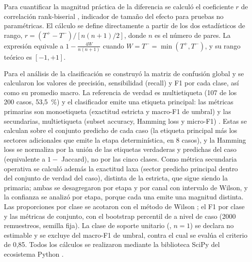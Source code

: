 Para cuantificar la magnitud práctica de la diferencia se calculó el coeficiente \(r\) de correlación rank-biserial \parencite{Kerby2014_rank_biserial}, indicador de tamaño del efecto para pruebas no paramétricas. El cálculo se define directamente a partir de los dos estadísticos de rango, \(r = (T^{+} - T^{-}) / [n(n+1)/2]\), donde \(n\) es el número de pares. La expresión equivale a \(1 - \frac{4W}{n(n+1)}\) cuando \(W = T^{-} = \min(T^{+}, T^{-})\), y su rango teórico es \([-1, +1]\).

Para el análisis de la clasificación se construyó la matriz de confusión global y se calcularon los valores de precisión, sensibilidad (recall) y F1 por cada clase, así como su promedio macro. La referencia de verdad es multietiqueta (107 de los 200 casos, 53,5~\%) y el clasificador emite una etiqueta principal: las métricas primarias son monoetiqueta (exactitud estricta y macro-F1 de umbral) y las secundarias, multietiqueta (subset accuracy, Hamming loss y micro-F1) \parencite{Tsoumakas2007_multilabel}. Estas se calculan sobre el conjunto predicho de cada caso (la etiqueta principal más los sectores adicionales que emite la etapa determinística, en 8 casos), y la Hamming loss se normaliza por la unión de las etiquetas verdaderas y predichas del caso (equivalente a \(1 -\) Jaccard), no por las cinco clases. Como métrica secundaria operativa se calculó además la exactitud laxa (sector predicho principal dentro del conjunto de verdad del caso), distinta de la estricta, que sigue siendo la primaria; ambas se desagregaron por etapa y por canal con intervalo de Wilson, y la confianza se analizó por etapa, porque cada una emite una magnitud distinta. Las proporciones por clase se acotaron con el método de Wilson \parencite{Wilson1927_probable_inference}; el F1 por clase y las métricas de conjunto, con el bootstrap percentil de \textcite{Efron1994_bootstrap} a nivel de caso (2000 remuestreos, semilla fija). La clase de soporte unitario (, \(n = 1\)) se declara no estimable y se excluye del macro-F1 de umbral, contra el cual se evalúa el criterio de 0,85. Todos los cálculos se realizaron mediante la biblioteca SciPy del ecosistema Python \parencite{Virtanen2020_scipy}.

